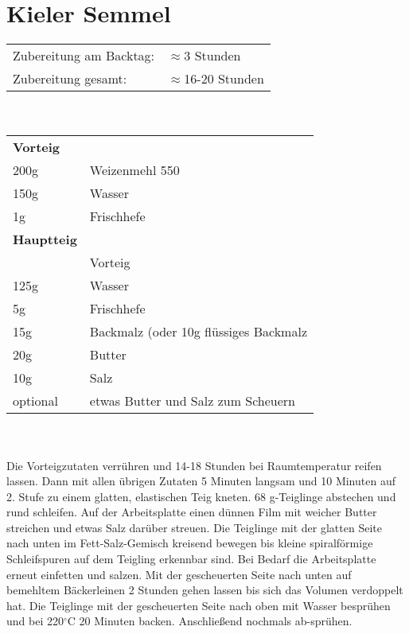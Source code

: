 \section{Kieler Semmel}
\begin{tabular}{ll}
    Zubereitung am Backtag: & $\approx$3 Stunden     \\
    Zubereitung gesamt:     & $\approx$16-20 Stunden
\end{tabular}\\

\paragraph{}
\begin{tabular}{ll}
    \textbf{Vorteig} \\
    200g     & Weizenmehl 550                        \\
    150g     & Wasser                                \\
    1g       & Frischhefe                            \\
    \textbf{Hauptteig} \\
    & Vorteig                               \\
    125g     & Wasser                                \\
    5g       & Frischhefe                            \\
    15g      & Backmalz (oder 10g flüssiges Backmalz \\
    20g      & Butter                                \\
    10g      & Salz                                  \\
    optional & etwas Butter und Salz zum Scheuern    \\
\end{tabular}\\

\paragraph{}
Die Vorteigzutaten verrühren und 14-18 Stunden bei Raumtemperatur reifen lassen. Dann mit allen übrigen Zutaten 5 Minuten langsam und 10 Minuten auf 2. Stufe zu einem glatten, elastischen Teig kneten. 68 g-Teiglinge abstechen und rund schleifen. Auf der Arbeitsplatte einen dünnen Film mit weicher Butter streichen und etwas Salz darüber streuen. Die Teiglinge mit der glatten Seite nach unten im Fett-Salz-Gemisch kreisend bewegen bis kleine spiralförmige Schleifspuren auf dem Teigling erkennbar sind. Bei Bedarf die Arbeitsplatte erneut einfetten und salzen. Mit der gescheuerten Seite nach unten auf bemehltem Bäckerleinen 2 Stunden gehen lassen bis sich das Volumen verdoppelt hat. Die Teiglinge mit der gescheuerten Seite nach oben mit Wasser besprühen und bei 220$^\circ$C 20 Minuten backen. Anschließend nochmals ab-sprühen.\newpage



